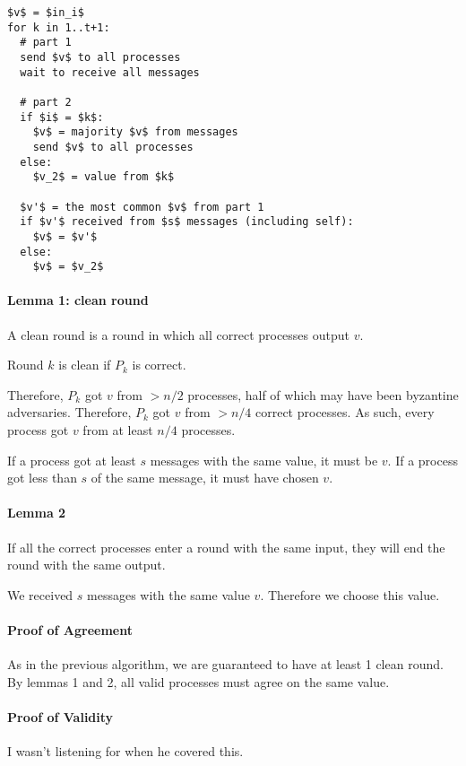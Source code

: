 \documentclass{idc_msc}
\begin{document}
\begin{lstlisting}[frame=L,mathescape=true,title={Algorithm for process $p_i$ with input $in_i$}]
$v$ = $in_i$
for k in 1..t+1:
  # part 1
  send $v$ to all processes
  wait to receive all messages

  # part 2
  if $i$ = $k$:
    $v$ = majority $v$ from messages
    send $v$ to all processes
  else:
    $v_2$ = value from $k$

  $v'$ = the most common $v$ from part 1
  if $v'$ received from $s$ messages (including self):
    $v$ = $v'$
  else:
    $v$ = $v_2$
\end{lstlisting}

\paragraph{Lemma 1: clean round}

A clean round is a round in which all correct processes output $v$.

Round $k$ is clean if $P_k$ is correct.

Therefore, $P_k$ got $v$ from $> n/2$ processes, half of which may have been byzantine adversaries.
Therefore, $P_k$ got $v$ from $> n/4$ correct processes.
As such, every process got $v$ from at least $n/4$ processes.

If a process got at least $s$ messages with the same value, it must be $v$.
If a process got less than $s$ of the same message, it must have chosen $v$.

\paragraph{Lemma 2}

If all the correct processes enter a round with the same input, they will end the round with the same output.

We received $s$ messages with the same value $v$.
Therefore we choose this value.

\paragraph{Proof of Agreement}
As in the previous algorithm, we are guaranteed to have at least 1 clean round.
By lemmas 1 and 2, all valid processes must agree on the same value.

\paragraph{Proof of Validity}
I wasn't listening for when he covered this.
\end{document}
